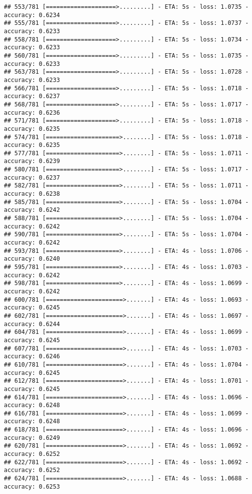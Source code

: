 \documentclass[
]{article}
\begin{document}
\begin{verbatim}
## 553/781 [====================>.........] - ETA: 5s - loss: 1.0735 - accuracy: 0.6234
## 555/781 [====================>.........] - ETA: 5s - loss: 1.0737 - accuracy: 0.6233
## 558/781 [====================>.........] - ETA: 5s - loss: 1.0734 - accuracy: 0.6233
## 560/781 [====================>.........] - ETA: 5s - loss: 1.0735 - accuracy: 0.6233
## 563/781 [====================>.........] - ETA: 5s - loss: 1.0728 - accuracy: 0.6233
## 566/781 [====================>.........] - ETA: 5s - loss: 1.0718 - accuracy: 0.6237
## 568/781 [====================>.........] - ETA: 5s - loss: 1.0717 - accuracy: 0.6236
## 571/781 [====================>.........] - ETA: 5s - loss: 1.0718 - accuracy: 0.6235
## 574/781 [=====================>........] - ETA: 5s - loss: 1.0718 - accuracy: 0.6235
## 577/781 [=====================>........] - ETA: 5s - loss: 1.0711 - accuracy: 0.6239
## 580/781 [=====================>........] - ETA: 5s - loss: 1.0717 - accuracy: 0.6237
## 582/781 [=====================>........] - ETA: 5s - loss: 1.0711 - accuracy: 0.6238
## 585/781 [=====================>........] - ETA: 5s - loss: 1.0704 - accuracy: 0.6242
## 588/781 [=====================>........] - ETA: 5s - loss: 1.0704 - accuracy: 0.6242
## 590/781 [=====================>........] - ETA: 5s - loss: 1.0704 - accuracy: 0.6242
## 593/781 [=====================>........] - ETA: 4s - loss: 1.0706 - accuracy: 0.6240
## 595/781 [=====================>........] - ETA: 4s - loss: 1.0703 - accuracy: 0.6242
## 598/781 [=====================>........] - ETA: 4s - loss: 1.0699 - accuracy: 0.6242
## 600/781 [======================>.......] - ETA: 4s - loss: 1.0693 - accuracy: 0.6245
## 602/781 [======================>.......] - ETA: 4s - loss: 1.0697 - accuracy: 0.6244
## 604/781 [======================>.......] - ETA: 4s - loss: 1.0699 - accuracy: 0.6245
## 607/781 [======================>.......] - ETA: 4s - loss: 1.0703 - accuracy: 0.6246
## 610/781 [======================>.......] - ETA: 4s - loss: 1.0704 - accuracy: 0.6245
## 612/781 [======================>.......] - ETA: 4s - loss: 1.0701 - accuracy: 0.6245
## 614/781 [======================>.......] - ETA: 4s - loss: 1.0696 - accuracy: 0.6248
## 616/781 [======================>.......] - ETA: 4s - loss: 1.0699 - accuracy: 0.6248
## 618/781 [======================>.......] - ETA: 4s - loss: 1.0696 - accuracy: 0.6249
## 620/781 [======================>.......] - ETA: 4s - loss: 1.0692 - accuracy: 0.6252
## 622/781 [======================>.......] - ETA: 4s - loss: 1.0692 - accuracy: 0.6252
## 624/781 [======================>.......] - ETA: 4s - loss: 1.0688 - accuracy: 0.6253

\end{verbatim}
\end{document}
